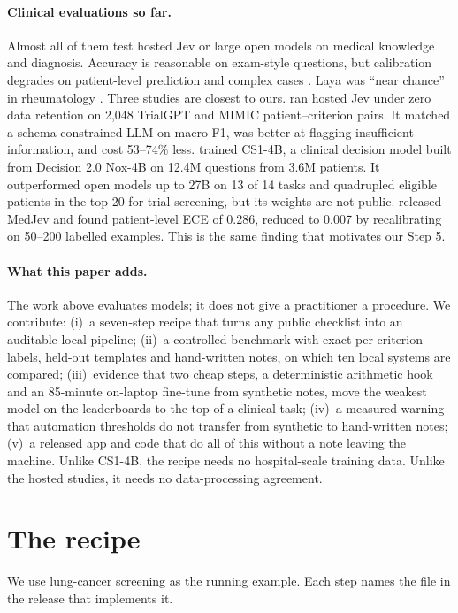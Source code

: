 \documentclass[11pt]{article}
\begin{document}
\paragraph{Clinical evaluations so far.}
Almost all of them test hosted Jev or large open models on medical knowledge and diagnosis.
Accuracy is reasonable on exam-style questions, but calibration degrades on patient-level prediction and complex cases \citep{du2026reliable,madrid2026rheum,you2026triage,deobhakta2026ddx}.
Laya was ``near chance'' in rheumatology \citep{madrid2026rheum}.
Three studies are closest to ours.
\citet{he2026trial} ran hosted Jev under zero data retention on 2{,}048 TrialGPT and MIMIC patient--criterion pairs. It matched a schema-constrained LLM on macro-F1, was better at flagging insufficient information, and cost 53--74\% less.
\citet{zhang2026cs1} trained CS1-4B, a clinical decision model built from Decision 2.0 Nox-4B on 12.4M questions from 3.6M patients. It outperformed open models up to 27B on 13 of 14 tasks and quadrupled eligible patients in the top 20 for trial screening, but its weights are not public.
\citet{lee2026medjev} released MedJev and found patient-level ECE of 0.286, reduced to 0.007 by recalibrating on 50--200 labelled examples. This is the same finding that motivates our Step 5.

\paragraph{What this paper adds.}
The work above evaluates models; it does not give a practitioner a procedure.
We contribute:
(i)~a seven-step recipe that turns any public checklist into an auditable local pipeline;
(ii)~a controlled benchmark with exact per-criterion labels, held-out templates and hand-written notes, on which ten local systems are compared;
(iii)~evidence that two cheap steps, a deterministic arithmetic hook and an 85-minute on-laptop fine-tune from synthetic notes, move the weakest model on the leaderboards to the top of a clinical task;
(iv)~a measured warning that automation thresholds do not transfer from synthetic to hand-written notes;
(v)~a released app and code that do all of this without a note leaving the machine.
Unlike CS1-4B, the recipe needs no hospital-scale training data. Unlike the hosted studies, it needs no data-processing agreement.

\section{The recipe}
\label{sec:recipe}
We use lung-cancer screening as the running example.
Each step names the file in the release that implements it.
\end{document}
